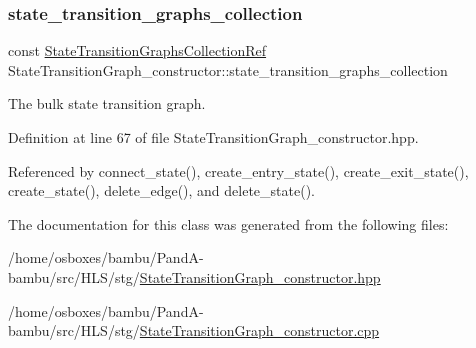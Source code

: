 \subsubsection{\texorpdfstring{state\+\_\+transition\+\_\+graphs\+\_\+collection}{state\_transition\_graphs\_collection}}
{\footnotesize\ttfamily const \hyperlink{state__transition__graph_8hpp_a2613a37dfdde13c61d36bfaba91f433e}{State\+Transition\+Graphs\+Collection\+Ref} State\+Transition\+Graph\+\_\+constructor\+::state\+\_\+transition\+\_\+graphs\+\_\+collection\hspace{0.3cm}{\ttfamily [private]}}



The bulk state transition graph. 



Definition at line 67 of file State\+Transition\+Graph\+\_\+constructor.\+hpp.



Referenced by connect\+\_\+state(), create\+\_\+entry\+\_\+state(), create\+\_\+exit\+\_\+state(), create\+\_\+state(), delete\+\_\+edge(), and delete\+\_\+state().



The documentation for this class was generated from the following files\+:\begin{DoxyCompactItemize}
\item 
/home/osboxes/bambu/\+Pand\+A-\/bambu/src/\+H\+L\+S/stg/\hyperlink{StateTransitionGraph__constructor_8hpp}{State\+Transition\+Graph\+\_\+constructor.\+hpp}\item 
/home/osboxes/bambu/\+Pand\+A-\/bambu/src/\+H\+L\+S/stg/\hyperlink{StateTransitionGraph__constructor_8cpp}{State\+Transition\+Graph\+\_\+constructor.\+cpp}\end{DoxyCompactItemize}
